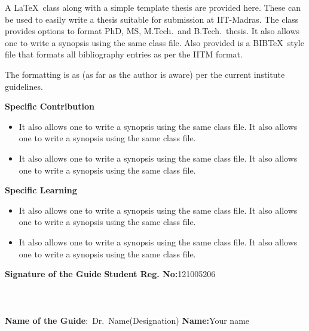\documentclass[a4paper, 12pt, oneside]{sastra}
\begin{document}
	
	\vspace*{24pt}
	
	\noindent A \LaTeX\ class along with a simple template thesis are provided here.  These can be used to easily write a thesis suitable for submission at IIT-Madras.  The class provides options to format PhD, MS, M.Tech.\ and B.Tech.\ thesis.  It also allows one to write a synopsis using the same class file.  Also provided is a BIB\TeX\ style file that formats all bibliography entries as per the IITM format.
	
	The formatting is as (as far as the author is aware) per the current institute guidelines.
	
	\noindent \textbf{Specific Contribution}
	\begin{itemize}
		\item It also allows one to write a synopsis using the same class file. It also allows one to write a synopsis using the same class file.
		\item It also allows one to write a synopsis using the same class file. It also allows one to write a synopsis using the same class file.
	\end{itemize}
	\noindent \textbf{Specific Learning}
	\begin{itemize}
		\item It also allows one to write a synopsis using the same class file. It also allows one to write a synopsis using the same class file.
		\item It also allows one to write a synopsis using the same class file. It also allows one to write a synopsis using the same class file.
	\end{itemize}
	
	\vspace*{24pt}
	
	\noindent \textbf{Signature of the Guide} \hspace*{66mm} \textbf{Student Reg. No:}121005206\\
		\\
	\\
	\\
\noindent \textbf{Name of the Guide}:~Dr.~Name(Designation) \hspace*{31mm} \textbf{Name:}Your name
\pagebreak
	
	
	
	\begin{singlespace}
		\tableofcontents
		\thispagestyle{empty}
		
		
		\listoffigures
		\listoftables
	\end{singlespace}
	
\end{document}
